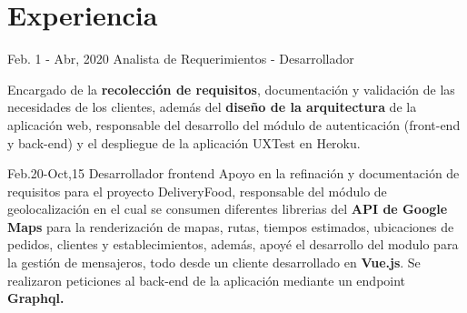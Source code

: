 \documentclass[american]{cv-class}
\begin{document}
\section{Experiencia}
\begin{entrylist}

	\entry
	{Feb. 1 - Abr, 2020}
	{Analista de Requerimientos - Desarrollador} 
	{ }
	{\justifying 
	    Encargado de la \textbf{recolección de requisitos}, documentación y validación de las necesidades de los clientes, además del  \textbf{diseño de la arquitectura} de la aplicación web, responsable del desarrollo del módulo de autenticación (front-end y back-end) y el despliegue de la aplicación UXTest en Heroku.
	
	}
	\entry
	{Feb.20-Oct,15}
	{Desarrollador frontend}
	{ }
	{\justifying 
	Apoyo en la refinación y documentación de requisitos para el proyecto DeliveryFood, responsable del módulo de geolocalización en el cual se consumen diferentes librerias del \textbf{API de Google Maps} para la renderización de mapas, rutas, tiempos estimados, ubicaciones de pedidos, clientes y establecimientos, además, apoyé el desarrollo del modulo para la gestión de mensajeros, todo desde un cliente desarrollado en \textbf{Vue.js}. Se realizaron peticiones al back-end de la aplicación mediante un endpoint \textbf{Graphql.}}
	
	
\end{entrylist}
\end{document}
